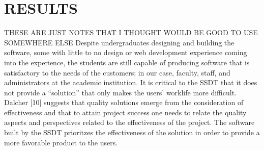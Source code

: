 \section{RESULTS}

THESE ARE JUST NOTES THAT I THOUGHT WOULD BE GOOD TO USE SOMEWHERE ELSE
Despite undergraduates designing and building the software, some with little to no design or web development experience coming into the experience, the students are still capable of producing software that is satisfactory to the needs of the customers; in our case, faculty, staff, and administrators at the academic institution.
It is critical to the SSDT that it does not provide a “solution” that only makes the users’ worklife more difficult.
Dalcher [10] suggests that quality solutions emerge from the consideration of effectiveness and that to attain project success one needs to relate the quality aspects and perspectives related to the effectiveness of the project. The software built by the SSDT prioritzes the effectiveness of the solution in order to provide a more favorable product to the users.
